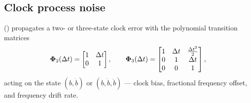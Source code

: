 \subsection{Clock process noise}
\label{sec:flt-clock-noise}

 () propagates a
two- or three-state clock error with the polynomial transition matrices
\begin{equation}
  \label{eq:flt-clock-phi}
  \bm{\Phi}_2(\Delta t) = \begin{bmatrix} 1 & \Delta t \\ 0 & 1 \end{bmatrix},
  \qquad
  \bm{\Phi}_3(\Delta t) = \begin{bmatrix}
    1 & \Delta t & \tfrac{\Delta t^2}{2} \\
    0 & 1        & \Delta t \\
    0 & 0        & 1
  \end{bmatrix} ,
\end{equation}
acting on the state $(b, \dot{b})$ or $(b, \dot{b}, \ddot{b})$ --- clock bias,
fractional frequency offset, and frequency drift rate.

